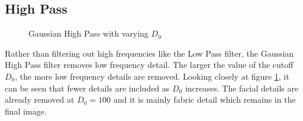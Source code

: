 \documentclass{article}
\begin{document}
\subsection*{High Pass}
\begin{figure}[h]
\centering
	\qquad
	\qquad
	\qquad
	\qquad
	\caption{Gaussian High Pass with varying $D_0$}
	\label{fig:q222}
\end{figure}

Rather than filtering out high frequencies like the Low Pass filter, the Gaussian High Pass filter removes low frequency detail. The larger the value of the cutoff $D_0$, the more low frequency details are removed. Looking closely at figure \ref{fig:q222}, it can be seen that fewer details are included as $D_0$ increases. The facial details are already removed at $D_0 = 100$ and it is mainly fabric detail which remains in the final image.
\end{document}
